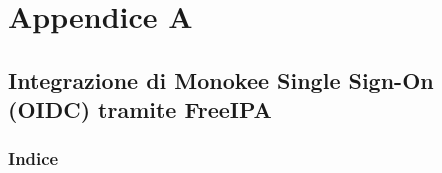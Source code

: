 
\chapter{Appendice A}

\hypertarget{integrazione-di-monokee-single-sign-on-oidc-tramite-freeipa}{%
\section{Integrazione di Monokee Single Sign-On (OIDC) tramite
FreeIPA}\label{integrazione-di-monokee-single-sign-on-oidc-tramite-freeipa}}


\hypertarget{indice}{%
\subsection{Indice}\label{indice}}

